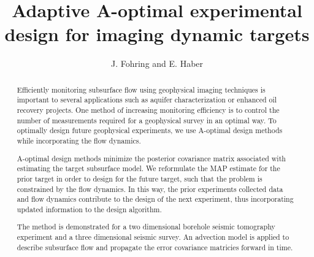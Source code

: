 \documentclass[12pt]{article}
\begin{document}
\title{Adaptive A-optimal experimental design for imaging dynamic targets}
\author{J. Fohring and E. Haber }


\maketitle
\begin{abstract}
Efficiently monitoring subsurface flow using geophysical imaging techniques is important to several applications such as aquifer characterization or enhanced oil recovery projects.
One method of increasing monitoring efficiency is to control the number of measurements required for a geophysical survey in an optimal way. To optimally design future geophysical experiments, we use A-optimal design methods while incorporating the flow dynamics.  

 A-optimal design methods minimize the posterior covariance matrix associated with estimating the target subsurface model. We reformulate the MAP estimate for the prior target in order to design for the future target, such that the problem is constrained by the flow dynamics. In this way, the prior experiments collected data and flow dynamics contribute to the design of the next experiment, thus incorporating updated information to the design algorithm. 
 
The method is demonstrated for a two dimensional borehole seismic tomography experiment and a three dimensional seismic survey. An advection model  is applied to describe subsurface flow and  propagate the error covariance matricies forward in time. 
 


\end{abstract}
\end{document}
